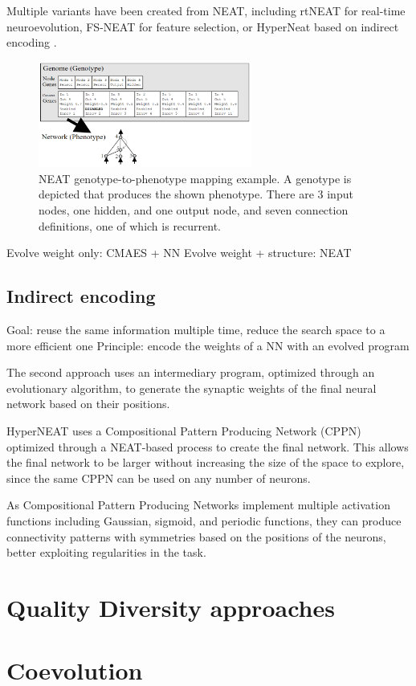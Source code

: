 Multiple variants have been created from NEAT, including rtNEAT \cite{rtNEAT} for real-time neuroevolution, FS-NEAT \cite{FS-NEAT} for feature selection, or HyperNeat based on indirect encoding \cite{HyperNEAT}.

\begin{figure}[H]
 \centering
 \captionsetup{justification=centering, margin=0.5cm}
 \includegraphics[width=7cm]{images/neat.png}
 \caption{\label{NEAT}NEAT genotype-to-phenotype mapping example. A genotype is depicted that produces the shown phenotype. There are 3 input nodes, one hidden, and one output node, and seven connection definitions, one of which is recurrent. \cite{NEAT_2}}
 \label{NEAT}
\end{figure}


Evolve weight only: CMAES + NN
Evolve weight + structure: NEAT

\subsection{Indirect encoding}
Goal: reuse the same information multiple time, reduce the search space to a more efficient one
Principle: encode the weights of a NN with an evolved program

The second approach uses an intermediary program, optimized through an evolutionary algorithm, to generate the synaptic weights of the final neural network based on their positions. 

HyperNEAT \cite{HyperNEAT} uses a Compositional Pattern Producing Network (CPPN) \cite{CPPN} optimized through a NEAT-based process to create the final network. This allows the final network to be larger without increasing the size of the space to explore, since the same CPPN can be used on any number of neurons.

As Compositional Pattern Producing Networks implement multiple activation functions including Gaussian, sigmoid, and periodic functions, they can produce connectivity patterns with symmetries based on the positions of the neurons, better exploiting regularities in the task.

\section{Quality Diversity approaches}

\section{Coevolution}

